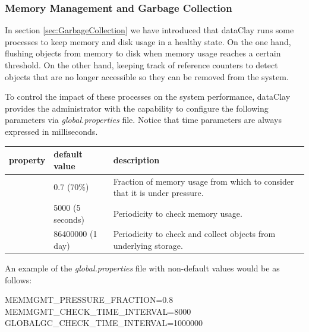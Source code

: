 \subsubsection{Memory Management and Garbage Collection}

In section \ref{sec:GarbageCollection} we have introduced that dataClay runs some processes to keep memory and disk usage in a healthy state. On the one hand, flushing objects from memory to disk when memory usage reaches a certain threshold. On the other hand, keeping track of reference counters to detect objects that are no longer accessible so they can be removed from the system.

To control the impact of these processes on the system performance, dataClay provides the administrator with the capability to configure the following parameters via \textit{global.properties} file. Notice that time parameters are always expressed in milliseconds.

\begin{table}[H]
\footnotesize
\begin{tBox}
\centering
\begin{tabular}{p{57mm} | p{27mm} |  >{\raggedright\arraybackslash}p{50mm}}
\textbf{property} & \textbf{default value} & \textbf{description} \\
\hline
\verb MEMMGMT_PRESSURE_FRACTION & 0.7 (70\%) & Fraction of memory usage from which to consider that it is under pressure. \\
\hline
\verb MEMMGMT_CHECK_TIME_INTERVAL & 5000 (5 seconds) & Periodicity to check memory usage. \\
\hline
\verb GLOBALGC_CHECK_TIME_INTERVAL & 86400000 (1 day) & Periodicity to check and collect objects from underlying storage. \\
\end{tabular}
\label{table:GarbageCollection}
\end{tBox}
\end{table}

An example of the \textit{global.properties} file with non-default values would be as follows:

\begin{tBox}
 \begin{bash}
MEMMGMT_PRESSURE_FRACTION=0.8
MEMMGMT_CHECK_TIME_INTERVAL=8000
GLOBALGC_CHECK_TIME_INTERVAL=1000000
 \end{bash}
\end{tBox}


